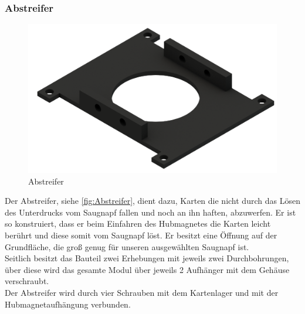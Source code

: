 \subsubsection{Abstreifer}
\begin{figure}
    \includegraphics[width=8 cm]{fig/mech/Abstreifer}
    \caption{Abstreifer}
    \label{fig:Abstreifer}
\end{figure}
Der Abstreifer, siehe \autoref{fig:Abstreifer}, dient dazu, Karten die nicht durch das Lösen des Unterdrucks vom Saugnapf fallen und noch an ihn haften,
abzuwerfen.
Er ist so konstruiert, dass er beim Einfahren des Hubmagnetes die Karten leicht berührt und diese somit vom
Saugnapf löst.
Er besitzt eine Öffnung auf der Grundfläche, die groß genug für unseren ausgewählten Saugnapf ist.\\
Seitlich besitzt das Bauteil zwei Erhebungen mit jeweils zwei Durchbohrungen, über diese wird das gesamte Modul über jeweils 2 Aufhänger
mit dem Gehäuse verschraubt. \\
Der Abstreifer wird durch vier Schrauben mit dem Kartenlager und mit der Hubmagnetaufhängung verbunden.



